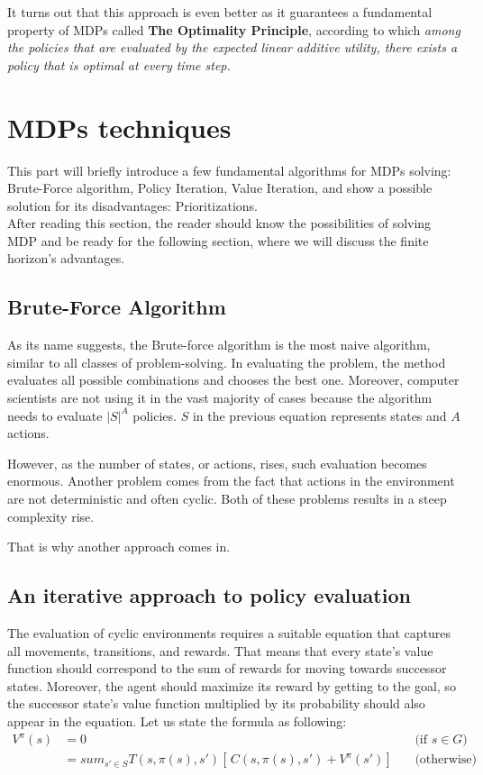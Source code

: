 It turns out that this approach is even better as it guarantees a fundamental property of MDPs called \textbf{The Optimality Principle}, according to which \textit{among the policies that are evaluated by the expected linear additive utility, there exists a policy that is optimal at every time step.}

\section{MDPs techniques}

This part will briefly introduce a few fundamental algorithms for MDPs solving: Brute-Force algorithm, Policy Iteration, Value Iteration, and show a possible solution for its disadvantages: Prioritizations. \\
After reading this section, the reader should know the possibilities of solving MDP and be ready for the following section, where we will discuss the finite horizon's advantages.

\subsection{Brute-Force Algorithm}
As its name suggests, the Brute-force algorithm is the most naive algorithm, similar to all classes of problem-solving. In evaluating the problem, the method evaluates all possible combinations and chooses the best one.
Moreover, computer scientists are not using it in the vast majority of cases because the algorithm needs to evaluate $|S|^{A}$ policies.
$S$ in the previous equation represents states and $A$ actions.

However, as the number of states, or actions, rises, such evaluation becomes enormous. Another problem comes from the fact that actions in the environment are not deterministic and often cyclic. Both of these problems results in a steep complexity rise.

That is why another approach comes in.

\subsection{An iterative approach to policy evaluation}

The evaluation of cyclic environments requires a suitable equation that captures all movements, transitions, and rewards.
That means that every state's value function should correspond to the sum of rewards for moving towards successor states. Moreover, the agent should maximize its reward by getting to the goal, so the successor state's value function multiplied by its probability should also appear in the equation. Let us state the formula as following:\\
\begin{equation}
\begin{aligned}
V^{\pi} (s) & = 0 && \text{(if $s \in G$)} \\
& = sum_{s' \in S} T(s, \pi (s), s') [ \,C(s, \pi(s), s') + V^{\pi} (s')] \, && \text{(otherwise)}
\end{aligned}
\end{equation}

